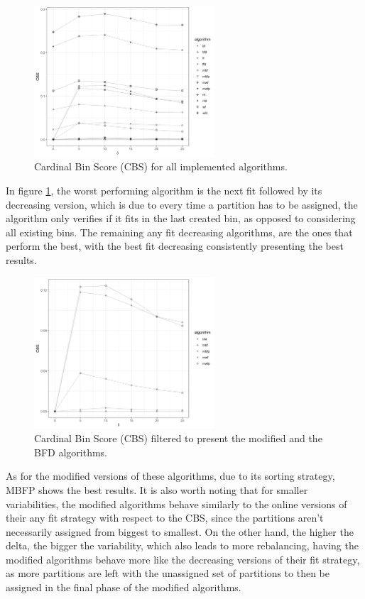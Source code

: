 \begin{figure}[htb!] 
\centering
\includegraphics[width=0.6\textwidth]{images/controller/relative.png} 
\caption{
    Cardinal Bin Score (CBS) for all implemented algorithms.
} 
\label{fig:relative_nconsumers} 
\end{figure}

In figure \ref{fig:relative_nconsumers}, the worst performing algorithm is the
next fit followed by its decreasing version, which is due to every time a
partition has to be assigned, the algorithm only verifies if it fits in the last
created bin, as opposed to considering all existing bins. The remaining any fit
decreasing algorithms, are the ones that perform the best, with the best fit
decreasing consistently presenting the best results. 

\begin{figure}[htb!] 
\centering
\includegraphics[width=0.6\textwidth]{images/controller/filtered_relative.png} 
\caption{
    Cardinal Bin Score (CBS) filtered to present the modified and the
    BFD algorithms.
} 
\label{fig:relative_nconsumers_modified} 
\end{figure}

As for the modified versions of these algorithms, due to its sorting strategy,
MBFP shows the best results. It is also worth noting that for smaller
variabilities, the modified algorithms behave similarly to the online versions
of their any fit strategy with respect to the CBS, since the partitions aren't
necessarily assigned from biggest to smallest. On the other hand, the higher the
delta, the bigger the variability, which also leads to more rebalancing, having
the modified algorithms behave more like the decreasing versions of their fit
strategy, as more partitions are left with the unassigned set of partitions to
then be assigned in the final phase of the modified algorithms.

